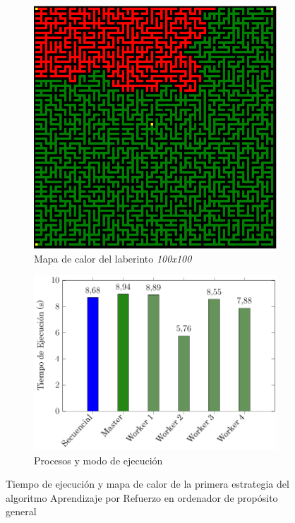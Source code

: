 \begin{figure}[!h]
	\centering
	\begin{subfigure}[t]{0.4\textwidth}
		\centering
		\includegraphics[width=\textwidth]{images/chapter_4/mapa_calor}
		\caption{Mapa de calor del laberinto \textit{100x100}}
		\label{fig:RL_mapa_calor}
	\end{subfigure}
	\hfill
	\begin{subfigure}[t]{0.5\textwidth}
		\centering
		\includegraphics[width=\textwidth]{images/chapter_4/histo}
		\caption{Procesos y modo de ejecución}
		\label{fig:RL_histo}
	\end{subfigure}
	\caption{Tiempo de ejecución y mapa de calor de la primera estrategia del algoritmo Aprendizaje por Refuerzo en ordenador de propósito general}
	\label{fig:RL_estrategia1}
\end{figure}


